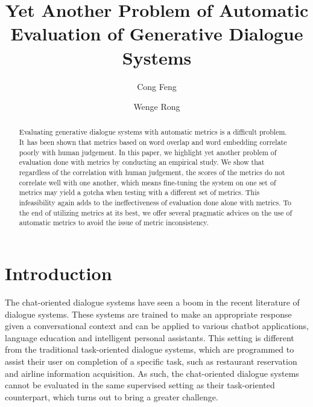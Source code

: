 \documentclass[runningheads]{llncs}
\begin{document}
    \title{Yet Another Problem of Automatic Evaluation of Generative Dialogue Systems}


    \author{Cong Feng \and Wenge Rong}



    \maketitle

    \begin{abstract}
        Evaluating generative dialogue systems with automatic metrics is a difficult problem. It has been shown that metrics based on word overlap and word embedding correlate poorly with human judgement. In this paper, we highlight yet another problem of evaluation done with metrics by conducting an empirical study. We show that regardless of the correlation with human judgement, the scores of the metrics do not correlate well with one another, which means fine-tuning the system on one set of metrics may yield a gotcha when testing with a different set of metrics. This infeasibility again adds to the ineffectiveness of evaluation done alone with metrics. To the end of utilizing metrics at its best, we offer several pragmatic advices on the use of automatic metrics to avoid the issue of metric inconsistency.

    \end{abstract}


    \section{Introduction}
    The chat-oriented dialogue systems have seen a boom in the recent literature of dialogue systems. These systems are trained to make an appropriate response given a conversational context and can be applied to various chatbot applications, language education and intelligent personal assistants. This setting is different from the traditional task-oriented dialogue systems, which are programmed to assist their user on completion of a specific task, such as restaurant reservation and airline information acquisition. As such, the chat-oriented dialogue systems cannot be evaluated in the same supervised setting as their task-oriented counterpart, which turns out to bring a greater challenge.
\end{document}
